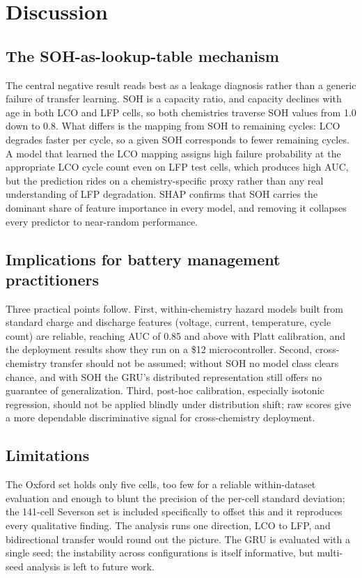 \documentclass[journal]{IEEEtran}
\begin{document}
\section{Discussion}

\subsection{The SOH-as-lookup-table mechanism}
The central negative result reads best as a leakage diagnosis rather than a generic failure of transfer learning. SOH is a capacity ratio, and capacity declines with age in both LCO and LFP cells, so both chemistries traverse SOH values from 1.0 down to 0.8. What differs is the mapping from SOH to remaining cycles: LCO degrades faster per cycle, so a given SOH corresponds to fewer remaining cycles. A model that learned the LCO mapping assigns high failure probability at the appropriate LCO cycle count even on LFP test cells, which produces high AUC, but the prediction rides on a chemistry-specific proxy rather than any real understanding of LFP degradation. SHAP confirms that SOH carries the dominant share of feature importance in every model, and removing it collapses every predictor to near-random performance.

\subsection{Implications for battery management practitioners}
Three practical points follow. First, within-chemistry hazard models built from standard charge and discharge features (voltage, current, temperature, cycle count) are reliable, reaching AUC of 0.85 and above with Platt calibration, and the deployment results show they run on a \$12 microcontroller. Second, cross-chemistry transfer should not be assumed; without SOH no model class clears chance, and with SOH the GRU's distributed representation still offers no guarantee of generalization. Third, post-hoc calibration, especially isotonic regression, should not be applied blindly under distribution shift; raw scores give a more dependable discriminative signal for cross-chemistry deployment.

\subsection{Limitations}
The Oxford set holds only five cells, too few for a reliable within-dataset evaluation and enough to blunt the precision of the per-cell standard deviation; the 141-cell Severson set is included specifically to offset this and it reproduces every qualitative finding. The analysis runs one direction, LCO to LFP, and bidirectional transfer would round out the picture. The GRU is evaluated with a single seed; the instability across configurations is itself informative, but multi-seed analysis is left to future work.
\end{document}
